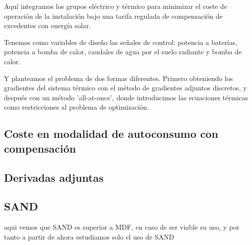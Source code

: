Aquí integramos los grupos eléctrico y térmico para minimizar el coste 
de operación de la instalación bajo una tarifa regulada de compensación
de excedentes con energía solar.

Tenemos como variables de diseño las señales de control: potencia a baterías,
potencia a bomba de calor, caudales de agua por el suelo radiante y bomba de calor.

Y planteamos el problema de dos formas diferentes. Primero obteniendo
los gradientes del sistema térmico con el método de gradientes adjuntos discretos,
y después con un método 'all-at-once', donde introducimos las ecuaciones
térmicas como restricciones al problema de optimización.


\subsection{Coste en modalidad de autoconsumo con compensación}
\subsection{Derivadas adjuntas}
\subsection{SAND}

aqui vemos que SAND es superior a MDF, en caso de ser viable su uso,
y por tanto a partir de ahora estudiamos solo el uso de SAND


